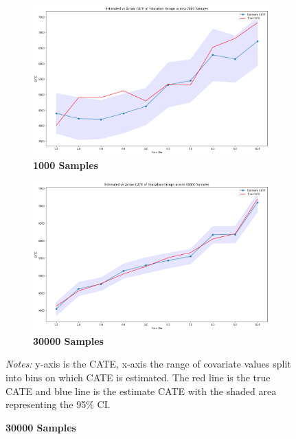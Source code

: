 \documentclass[12pt]{article}
\begin{document}
\begin{figure}[!htp]
\caption{Estimated vs. Actual CATE across Education Level}
	\centering
	\begin{subfigure} [h] {0.49\linewidth}
		\caption{\textbf{1000 Samples}}
   	 	\includegraphics[width = \linewidth]{Graphs/s2_educ2000.png}
	\end{subfigure}
	\begin{subfigure} [h] {0.49\linewidth}
		\caption{\textbf{30000 Samples}}
   	 	\includegraphics[width = \linewidth]{Graphs/s2_educ60000.png}
	\end{subfigure}
\footnotesize
\emph{Notes:}  y-axis is the CATE, x-axis the range of covariate values split into bins on which CATE is estimated. The red line is the true CATE and blue line is the estimate CATE with the shaded area representing the 95\% CI.
\end{figure} 
\end{document}
